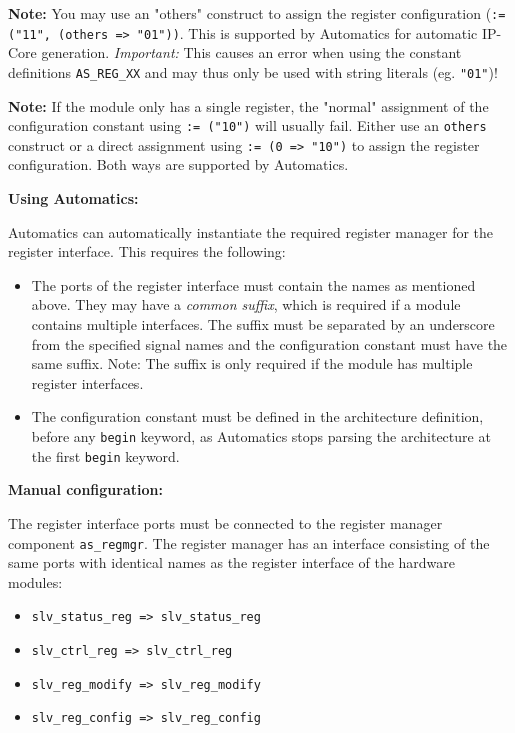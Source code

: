 \textbf{Note:} You may use an "others" construct to assign the register configuration (\texttt{:= ("11", (others => "01"))}. This is supported by Automatics for automatic IP-Core generation. \textit{Important:} This causes an error when using the constant definitions \texttt{AS\_REG\_XX} and may thus only be used with string literals (eg. \texttt{"01"})!

\textbf{Note:} If the module only has a single register, the "normal" assignment of the configuration constant using \texttt{:= ("10")} will usually fail. Either use an \texttt{others} construct or a direct assignment using \texttt{:= (0 => "10")} to assign the register configuration. Both ways are supported by Automatics.

\bigskip

\textbf{Using Automatics:}

Automatics can automatically instantiate the required register manager for the register interface.
This requires the following:
\begin{itemize}
\item The ports of the register interface must contain the names as mentioned above. They may have a \textit{common suffix}, which is required if a module contains multiple interfaces. The suffix must be separated by an underscore from the specified signal names and the configuration constant must have the same suffix. Note: The suffix is only required if the module has multiple register interfaces.
\item The configuration constant must be defined in the architecture definition, before any \texttt{begin} keyword, as Automatics stops parsing the architecture at the first \texttt{begin} keyword.
\end{itemize} 

\textbf{Manual configuration:}

The register interface ports must be connected to the register manager component \texttt{as\_regmgr}.
The register manager has an interface consisting of the same ports with identical names as the register interface of the hardware modules:
\begin{itemize}
\item \texttt{slv\_status\_reg => slv\_status\_reg}
\item \texttt{slv\_ctrl\_reg => slv\_ctrl\_reg}
\item \texttt{slv\_reg\_modify => slv\_reg\_modify}
\item \texttt{slv\_reg\_config => slv\_reg\_config}
\end{itemize}
\bigskip

